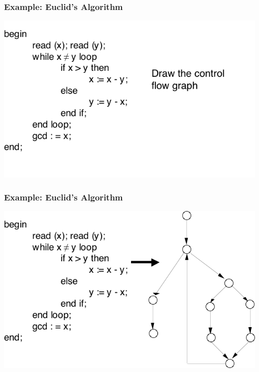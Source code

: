 \documentclass[t,12pt,numbers,fleqn]{beamer}
\begin{document}
\begin{frame}
\frametitle{Example: Euclid's Algorithm}

\includegraphics[scale=0.5]{../Figures/EuclidsAlgorithmNoGraph.png}

\end{frame}


\begin{frame}
\frametitle{Example: Euclid's Algorithm}

\includegraphics[scale=0.5]{../Figures/EuclidsAlgorithm.png}

\end{frame}

\end{document}
